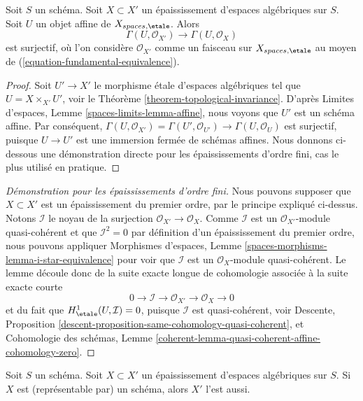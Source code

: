 \begin{lemma}
\label{lemma-first-order-thickening-surjective}
Soit $S$ un schéma. Soit $X \subset X'$ un épaississement
d'espaces algébriques sur $S$. Soit $U$ un objet affine de
$X_{spaces, \etale}$. Alors
$$
\Gamma(U, \mathcal{O}_{X'}) \to \Gamma(U, \mathcal{O}_X)
$$
est surjectif, où l'on considère $\mathcal{O}_{X'}$ comme un faisceau sur
$X_{spaces, \etale}$ au moyen de (\ref{equation-fundamental-equivalence}).
\end{lemma}

\begin{proof}
Soit $U' \to X'$ le morphisme étale d'espaces algébriques tel que
$U = X \times_{X'} U'$, voir le Théorème \ref{theorem-topological-invariance}.
D'après Limites d'espaces, Lemme \ref{spaces-limits-lemma-affine}, nous voyons
que $U'$ est un schéma affine. Par conséquent,
$\Gamma(U, \mathcal{O}_{X'}) = \Gamma(U', \mathcal{O}_{U'}) \to
\Gamma(U, \mathcal{O}_U)$
est surjectif, puisque $U \to U'$ est une immersion fermée de schémas affines.
Nous donnons ci-dessous une démonstration directe pour les épaississements d'ordre fini,
cas le plus utilisé en pratique.
\end{proof}

\begin{proof}[Démonstration pour les épaississements d'ordre fini]
Nous pouvons supposer que $X \subset X'$ est un épaississement du premier ordre, par le
principe expliqué ci-dessus. Notons $\mathcal{I}$ le noyau de la surjection
$\mathcal{O}_{X'} \to \mathcal{O}_X$. Comme $\mathcal{I}$ est un
$\mathcal{O}_{X'}$-module quasi-cohérent et que $\mathcal{I}^2 = 0$ par définition
d'un épaississement du premier ordre, nous pouvons appliquer
Morphismes d'espaces, Lemme
\ref{spaces-morphisms-lemma-i-star-equivalence}
pour voir que $\mathcal{I}$ est un $\mathcal{O}_X$-module quasi-cohérent.
Le lemme découle donc de la suite exacte longue de cohomologie
associée à la suite exacte courte
$$
0 \to \mathcal{I} \to \mathcal{O}_{X'} \to \mathcal{O}_X \to 0
$$
et du fait que $H^1_\etale(U, \mathcal{I}) = 0$, puisque
$\mathcal{I}$ est quasi-cohérent, voir
Descente, Proposition \ref{descent-proposition-same-cohomology-quasi-coherent},
et Cohomologie des schémas, Lemme
\ref{coherent-lemma-quasi-coherent-affine-cohomology-zero}.
\end{proof}

\begin{lemma}
\label{lemma-thickening-scheme}
Soit $S$ un schéma. Soit $X \subset X'$ un épaississement d'espaces algébriques
sur $S$. Si $X$ est (représentable par) un schéma, alors $X'$ l'est aussi.
\end{lemma}

